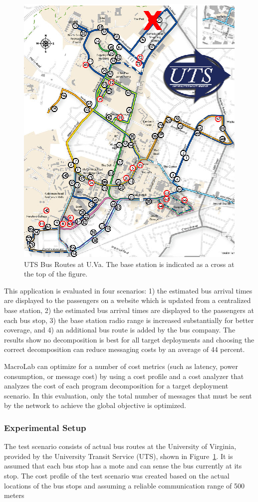 \begin{figure}
  \centering
  \includegraphics[width=.6\columnwidth]{fig/UTSBusRoutes}
  \caption[University Transit Service (UTS) bus routes at the University of
  Virginia (U.Va.)]{UTS Bus Routes at U.Va. The base station is indicated as a
  cross at the top of the figure.}
  \label{fig:UTS}
\end{figure}

This application is evaluated in four scenarios: 1) the estimated bus arrival
times are displayed to the passengers on a website which is updated from a
centralized base station, 2) the estimated bus arrival times are displayed to
the passengers at each bus stop, 3) the base station radio range is increased
substantially for better coverage, and 4) an additional bus route is added by
the bus company. The results show no decomposition is best for all target
deployments and choosing the correct decomposition can reduce messaging
costs by an average of 44 percent.

MacroLab can optimize for a number of cost metrics (such as latency, power
consumption, or message cost) by using a cost profile and a cost analyzer that
analyzes the cost of each program decomposition for a target deployment
scenario. In this evaluation, only the total number of messages that must be
sent by the network to achieve the global objective is optimized.

\subsubsection{Experimental Setup}\label{sect:setup}
The test scenario consists of actual bus routes at the University of Virginia,
provided by the University Transit Service (UTS), shown in Figure~\ref{fig:UTS}.
It is assumed that each bus stop has a mote and can sense the bus currently at its
stop.  The cost profile of the test scenario was created based on the actual
locations of the bus stops and assuming a reliable communication range of 500 meters

